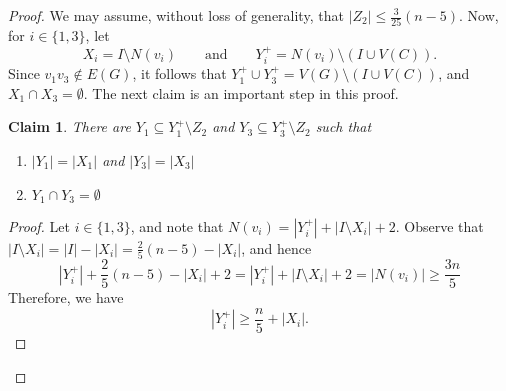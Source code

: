 \documentclass[a4paper,12pt]{article}
\newtheorem{claim}{Claim}[theorem]
\begin{document}
\begin{proof}
    We may assume, without loss of generality, that $|Z_2|\leq\frac{3}{25}(n-5)$.
    Now, for \(i \in\{1,3\}\), let 
    \[X_i = I\setminus N(v_i) \qquad\text{and}\qquad Y^+_i=N(v_i)\setminus(I\cup V(C)).\]
    Since $v_1v_3\not\in E(G)$, it follows that $Y^+_1\cup Y^+_3=V(G)\setminus(I\cup V(C))$,
    and $X_1\cap X_3 = \emptyset$.
    The next claim is an important step in this proof.
    
    \begin{claim}
    There are $Y_1\subseteq Y^+_1\setminus Z_2$ and $Y_3\subseteq Y^+_3\setminus Z_2$ such that  
    \begin{enumerate} %
        \item $|Y_1|=|X_1|$ and $|Y_3|=|X_3|$
        \item $Y_1\cap Y_3 = \emptyset$    
    \end{enumerate}
    \end{claim}
    \begin{proof}
        Let \(i\in \{1,3\}\),
        and note that $N(v_i) = |Y^+_i|+|I\setminus X_i|+2$.
        Observe that \(|I\setminus X_i| = |I| - |X_i| = \frac{2}{5}(n-5) - |X_i|\), and hence
         \[
            |Y^+_i|+\frac{2}{5}(n-5)-|X_i|+2
            = |Y^+_i|+|I\setminus X_i|+2
            = |N(v_i)|
            \geq \frac{3n}{5}
        \]
        Therefore, we have
        \begin{equation}\label{eq:lowerbound:Yi+}
            |Y^+_i|\geq \frac{n}{5}+|X_i|.
        \end{equation}
        

\end{proof}
\end{proof}
\end{document}
